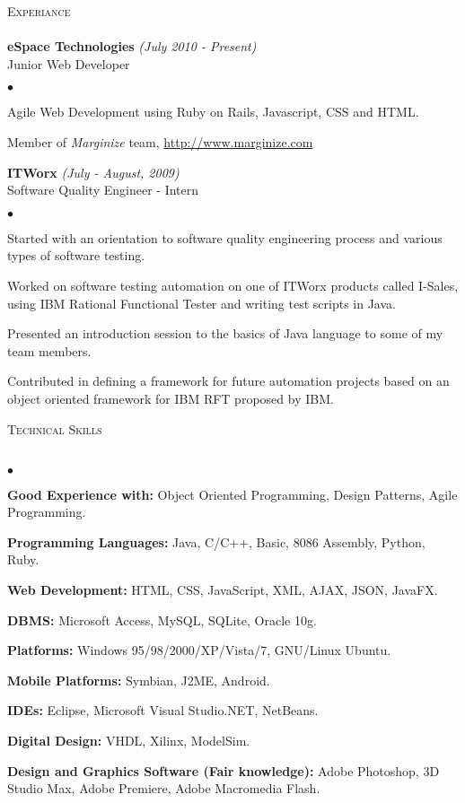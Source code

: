 \documentclass[letterpaper,12pt]{article}
\newcommand{\lineunder}{\vspace*{-8pt} \\ \hspace*{-8pt} \hrulefill \\}
\newcommand{\interval}[1] { \textit{(#1)} }
\newcommand{\header}[1]{{\hspace*{0pt}\vspace*{6pt} \textsc{#1}} \vspace*{-6pt} \lineunder}
\newcommand{\employer}[3]{{ \textbf{#1} \interval{#2}\\{#3}\\ }}
\newenvironment{achievements}{\begin{list}{$\bullet$}{\topsep 0pt \itemsep -2pt}}{\vspace*{4pt}\end{list}}
\begin{document}
\header{Experiance}
\employer{eSpace Technologies}{July 2010 - Present}{Junior Web Developer}
  \begin{achievements}
    \item Agile Web Development using Ruby on Rails, Javascript, CSS and HTML.
    \item Member of \textit{Marginize} team, \url{http://www.marginize.com}
  \end{achievements}
\vspace*{4pt}
\employer{ITWorx}{July - August, 2009}{Software Quality Engineer - Intern}
  \begin{achievements}
    \item Started with an orientation to software quality engineering process and various types of software testing.
    \item Worked on software testing automation on one of ITWorx products called I-Sales, using IBM Rational Functional Tester and writing test scripts in Java.
    \item Presented an introduction session to the basics of Java language to some of my team members.
    \item Contributed in defining a framework for future automation projects based on an object oriented framework for IBM RFT proposed by IBM.
  \end{achievements}
\vspace*{4pt}

\header{Technical Skills}
\begin{achievements}
  \item \textbf{Good Experience with:} Object Oriented Programming, Design Patterns, Agile Programming.
  \item \textbf{Programming Languages:} Java, C/C++, Basic, 8086 Assembly, Python, Ruby.
  \item \textbf{Web Development:} HTML, CSS, JavaScript, XML, AJAX, JSON, JavaFX.
  \item \textbf{DBMS:} Microsoft Access, MySQL, SQLite, Oracle 10g.
  \item \textbf{Platforms:} Windows 95/98/2000/XP/Vista/7, GNU/Linux Ubuntu.
  \item \textbf{Mobile Platforms:} Symbian, J2ME, Android.
  \item \textbf{IDEs:} Eclipse, Microsoft Visual Studio.NET, NetBeans.
  \item \textbf{Digital Design:} VHDL, Xilinx, ModelSim.
  \item \textbf{Design and Graphics Software (Fair knowledge):} Adobe Photoshop, 3D Studio Max, Adobe Premiere, Adobe Macromedia Flash.
\end{achievements}
\vspace*{4pt}
\end{document}
